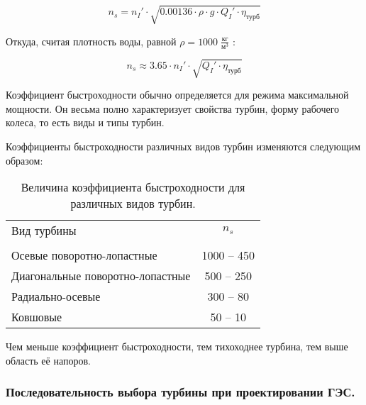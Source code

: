 $$
  n_s = n_I' \cdot \sqrt{0.00136 \cdot \rho \cdot g \cdot Q_I' \cdot \eta_{\text{турб}} }
$$

Откуда, считая плотность воды, равной $\rho = 1000 \; \frac{\text{кг}}{\text{м}^3}$ :

\begin{equation}
\label{eq_fyk}
   n_s \approx 3.65 \cdot n_I' \cdot \sqrt{Q_I' \cdot \eta_{\text{турб}}}
\end{equation}

Коэффициент быстроходности обычно определяется  для режима максимальной мощности. Он весьма полно характеризует свойства турбин, форму рабочего колеса, то есть виды и типы турбин.

Коэффициенты быстроходности различных видов турбин изменяются следующим образом:

\begin{table}[ht]
\caption{Величина коэффициента быстроходности для различных видов турбин.}
\label{tab_2s}
\centering

\begin{tabular}{|l|c|}
\hline
  \hspace{2 cm} Вид турбины & $n_s$\\
   & \\ 
\hline
  Осевые поворотно-лопастные & 1000 -- 450 \\
  Диагональные поворотно-лопастные & 500 -- 250 \\
  Радиально-осевые & 300 -- 80 \\
  Ковшовые & 50 -- 10 \\

\hline
\end{tabular}
\end{table}



Чем меньше коэффициент быстроходности, тем тихоходнее турбина, тем выше область её напоров.




\subsubsection[Последовательность выбора турбины.]{Последовательность выбора турбины при проектировании ГЭС.}

